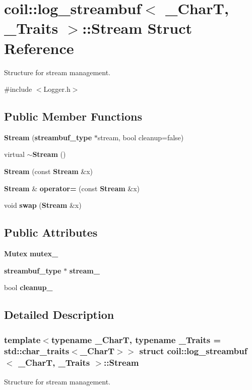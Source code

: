 \section{coil::log\_\-streambuf$<$ \_\-CharT, \_\-Traits $>$::Stream Struct Reference}
\label{structcoil_1_1log__streambuf_1_1Stream}


Structure for stream management.  




{\ttfamily \#include $<$Logger.h$>$}

\subsection*{Public Member Functions}
\begin{DoxyCompactItemize}
\item 
{\bf Stream} ({\bf streambuf\_\-type} $\ast$stream, bool cleanup=false)
\item 
virtual {\bf $\sim$Stream} ()
\item 
{\bf Stream} (const {\bf Stream} \&x)
\item 
{\bf Stream} \& {\bf operator=} (const {\bf Stream} \&x)
\item 
void {\bf swap} ({\bf Stream} \&x)
\end{DoxyCompactItemize}
\subsection*{Public Attributes}
\begin{DoxyCompactItemize}
\item 
{\bf Mutex} {\bf mutex\_\-}
\item 
{\bf streambuf\_\-type} $\ast$ {\bf stream\_\-}
\item 
bool {\bf cleanup\_\-}
\end{DoxyCompactItemize}


\subsection{Detailed Description}
\subsubsection*{template$<$typename \_\-CharT, typename \_\-Traits = std::char\_\-traits$<$\_\-CharT$>$$>$ struct coil::log\_\-streambuf$<$ \_\-CharT, \_\-Traits $>$::Stream}

Structure for stream management. 

